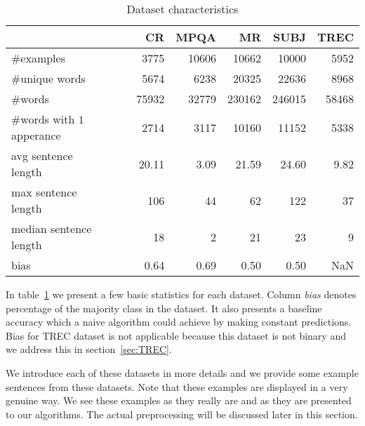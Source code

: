     \begin{table}[h]
    \begin{center}
    
    \begin{tabular}{l|rrrrr}
    \toprule
    {} &        CR &      MPQA &         MR &      SUBJ &      TREC \\\hline
    \midrule
    \#examples                                &   3775 &  10606 &   10662 &   10000 &   5952 \\\hline
    \#unique words                            &   5674 &   6238 &   20325 &   22636 &   8968 \\\hline
    \#words                                   &  75932 &  32779 &  230162 &  246015 &  58468 \\\hline
    \specialcell{\#words with\\$1$ apperance} &   2714 &   3117 &   10160 &   11152 &   5338 \\\hline
    \specialcell{avg sentence\\length}       &     20.11 &      3.09 &      21.59 &      24.60 &      9.82 \\\hline
    \specialcell{max sentence\\length}       &    106 &     44 &      62 &     122 &     37 \\\hline
    \specialcell{median sentence\\length}    &     18 &      2 &      21 &      23 &      9 \\\hline
    bias                                     &      0.64 &      0.69 &       0.50 &       0.50 &       NaN \\
    \bottomrule
    \end{tabular}
    
    \caption[Dataset characteristics]{Dataset characteristics}
    \label{tab:datasets:stats}
    \end{center}
    \end{table}


    In table~\ref{tab:datasets:stats} we present a few basic statistics for each dataset.
    Column \emph{bias} denotes percentage of the majority class in the dataset.
    It also presents a baseline accuracy which a naive algorithm could achieve by making constant predictions. 
    Bias for TREC dataset is not applicable because this dataset is not binary and we address this in section~\ref{sec:TREC}.
    
    We introduce each of these datasets in more details and we provide some example sentences from these datasets.
    Note that these examples are displayed in a very genuine way. 
    We see these examples as they really are and as they are presented to our algorithms.
    The actual preprocessing will be discussed later in this section.
    
